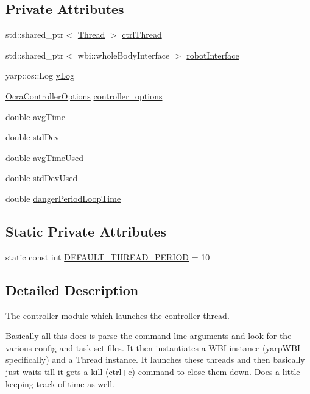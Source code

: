 \subsection*{Private Attributes}
\begin{DoxyCompactItemize}
\item 
std\+::shared\+\_\+ptr$<$ \hyperlink{classThread}{Thread} $>$ \hyperlink{classModule_a39346aa2e2a00801e07f4c127ff004ba}{ctrl\+Thread}
\item 
std\+::shared\+\_\+ptr$<$ wbi\+::whole\+Body\+Interface $>$ \hyperlink{classModule_a0d3efedabcef6ec0db88011ccc2e7205}{robot\+Interface}
\item 
yarp\+::os\+::\+Log \hyperlink{classModule_ae029b50069bf4ff53a6f69a5bae824f6}{y\+Log}
\item 
\hyperlink{classOcraControllerOptions}{Ocra\+Controller\+Options} \hyperlink{classModule_a04156183c6e15f118595e3637ab5372f}{controller\+\_\+options}
\item 
double \hyperlink{classModule_a1a20dbf0d18e5020ad85d38a0ba22b88}{avg\+Time}
\item 
double \hyperlink{classModule_af66a2dab82208cb2ea25da22fcaaa4a3}{std\+Dev}
\item 
double \hyperlink{classModule_a5baf8260eb8a45ebbb75474f2b277edc}{avg\+Time\+Used}
\item 
double \hyperlink{classModule_a57060f2788b6dc9906e66432e775e5ac}{std\+Dev\+Used}
\item 
double \hyperlink{classModule_a33fee1e7f977b4f27a2e1488480996fb}{danger\+Period\+Loop\+Time}
\end{DoxyCompactItemize}
\subsection*{Static Private Attributes}
\begin{DoxyCompactItemize}
\item 
static const int \hyperlink{classModule_af73cdfdae53c52ea8488d0d8c4f9083f}{D\+E\+F\+A\+U\+L\+T\+\_\+\+T\+H\+R\+E\+A\+D\+\_\+\+P\+E\+R\+I\+OD} = 10
\end{DoxyCompactItemize}


\subsection{Detailed Description}
The controller module which launches the controller thread. 

Basically all this does is parse the command line arguments and look for the various config and task set files. It then instantiates a W\+BI instance (yarp\+W\+BI specifically) and a \hyperlink{classThread}{Thread} instance. It launches these threads and then basically just waits till it gets a kill (ctrl+c) command to close them down. Does a little keeping track of time as well. 

